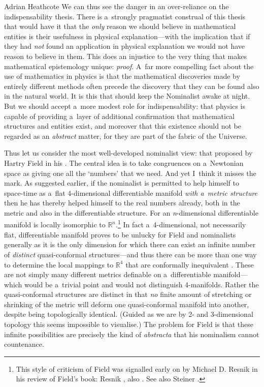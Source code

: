\begin{artengenv}{Adrian Heathcote}
We can thus see the danger in an over-reliance on the indispensability thesis. There is a~strongly pragmatist construal of this thesis that would have it that the \textit{only} reason we should believe in mathematical entities is their usefulness in physical explanation---with the implication that if they had \textit{not} found an application in physical explanation we would not have reason to believe in them. This does an injustice to the very thing that makes mathematical epistemology unique: \textit{proof}. A~far more compelling fact about the use of mathematics in physics is that the mathematical discoveries made by entirely different methods often precede the discovery that they can be found also in the natural world. It is this that should keep the Nominalist awake at night. But we should accept a~more modest role for indispensability: that physics is capable of providing a~layer of additional confirmation that mathematical structures and entities exist, and moreover that this existence should not be regarded as an \textit{abstract} matter, for they are part of the fabric of the Universe.

Thus let us consider the most well-developed nominalist view: that proposed by Hartry Field in his \parencite*{field_science_1980}. The central idea is to take congruences on a~Newtonian space as giving one all the `numbers' that we need. And yet I~think it misses the mark. As suggested earlier, if the nominalist is permitted to help himself to space-time as a~flat 4-dimensional differentiable manifold \textit{with a~metric structure} then he has thereby helped himself to the real numbers already, both in the metric and also in the differentiable structure. For an \textit{n}-dimensional differentiable manifold is locally isomorphic to $\mathbb{R}^{n}$.\footnote{This style of criticism of Field was signalled early on by Michael D. Resnik in his review of Field's book: Resnik \parencite*{resnik_hartry_1983}, also \parencite{resnik_how_1985}. See also Steiner \parencite*{steiner_applicability_1998}.} In fact a~4-dimensional, not necessarily flat, differentiable manifold proves to be unlucky for Field and nominalists generally as it is the only dimension for which there can exist an infinite number of \textit{distinct} quasi-conformal structures---and thus there can be more than one way to determine the local mappings to $\mathbb{R}^{4}$ that are conformally inequivalent \parencite{donaldson_quasiconformal_1989}. These are not simply many different metrics definable on a~differentiable manifold---which would be a~trivial point and would not distinguish 4-manifolds. Rather the quasi-conformal structures are distinct in that \textit{no} finite amount of stretching or shrinking of the metric will deform one quasi-conformal manifold into another, despite being topologically identical. (Guided as we are by 2- and 3-dimensional topology this seems impossible to visualise.) The problem for Field is that these infinite possibilities are precisely the kind of \textit{abstracta} that his nominalism cannot countenance.


\end{artengenv}
